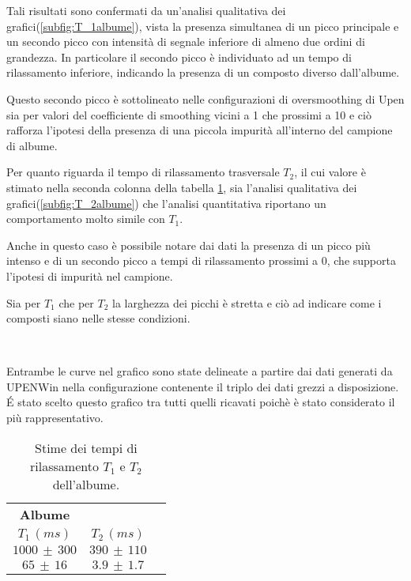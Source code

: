 Tali risultati sono confermati da un'analisi qualitativa dei grafici(\ref{subfig:T_1albume}), vista la presenza simultanea di un picco principale e un secondo picco con intensità di segnale inferiore di almeno due ordini di grandezza. 
In particolare il secondo picco è individuato ad un tempo di rilassamento inferiore, indicando la presenza di un composto diverso dall'albume.

Questo secondo picco è sottolineato nelle configurazioni di oversmoothing di Upen sia per valori del coefficiente di smoothing vicini a 1 che prossimi a 10 e ciò rafforza l'ipotesi della presenza di una piccola impurità all'interno del campione di albume. 

Per quanto riguarda il tempo di rilassamento trasversale $T_2$, il cui valore è stimato nella seconda colonna della tabella \ref{tab:Albume}, sia l'analisi qualitativa dei grafici(\ref{subfig:T_2albume}) che l'analisi quantitativa riportano un comportamento molto simile con $T_1$.

Anche in questo caso è possibile notare dai dati la presenza di un picco più intenso e di un secondo picco a tempi di rilassamento prossimi a 0, che supporta l'ipotesi di impurità nel campione.

Sia per $T_1$ che per $T_2$ la larghezza dei picchi è stretta e ciò ad indicare come i composti siano nelle stesse condizioni. 

\begin{figure}[ht]
\centering
{} \quad
{} \\
\caption{}
\label{fig:T_albume}
\end{figure}

Entrambe le curve nel grafico sono state delineate a partire dai dati generati da UPENWin nella configurazione contenente il triplo dei dati grezzi a disposizione.
\'E stato scelto questo grafico tra tutti quelli ricavati poichè è stato considerato il più rappresentativo.

\begin{table}[ht]
	\centering
	\begin{tabular}{ccc}
	\toprule
					\textbf{Albume}	\\
		$T_1\,(ms)$ 		& 		$T_2\,(ms)$ 		\\	
	\midrule
		$1000\,\pm\,300$	&		$390\,\pm\,110$		\\
		$65\,\pm\,16$		&		$3.9\,\pm\,1.7$		\\
	\bottomrule
	\end{tabular}
	\caption{Stime dei tempi di rilassamento $T_1$ e $T_2$ dell'albume.}
	\label{tab:Albume}
\end{table}

